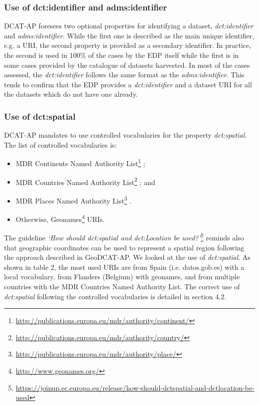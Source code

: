 \documentclass[<options>]{elsarticle}
\begin{document}
\subsubsection{Use of dct:identifier and adms:identifier}
DCAT-AP foresees two optional properties for identifying a dataset, \textit{dct:identifier} and \textit{adms:identifier}. While the first one is described as the main unique identifier, e.g. a URI, the second property is provided as a secondary identifier. In practice, the second is used in 100\% of the cases by the EDP itself while the first is in some cases provided by the catalogue of datasets harvested. In most of the cases assessed, the \textit{dct:identifier} follows the same format as the \textit{adms:identifier}. This tends to confirm that the EDP provides a \textit{dct:identifier} and a dataset URI for all the datasets which do not have one already.

\subsubsection{Use of dct:spatial}
DCAT-AP mandates to use controlled vocabularies for the property \textit{dct:spatial}. The list of controlled vocabularies is:

\begin{itemize}
\item MDR Continents Named Authority List\footnote{\href{  http://publications.europa.eu/mdr/authority/continent/}{  http://publications.europa.eu/mdr/authority/continent/}} ;
\item MDR Countries Named Authority List\footnote{\href{  http://publications.europa.eu/mdr/authority/country/}{  http://publications.europa.eu/mdr/authority/country/}} ; and
\item MDR Places Named Authority List\footnote{\href{  http://publications.europa.eu/mdr/authority/place/}{  http://publications.europa.eu/mdr/authority/place/}} .
\item Otherwise, Geonames\footnote{\href{  http://www.geonames.org/}{  http://www.geonames.org/}} URIs.
\end{itemize}

The guideline \textit{‘How should dct:spatial and dct:Location be used?’}\footnote{\href{  https://joinup.ec.europa.eu/release/how-should-dctspatial-and-dctlocation-be-used}{  https://joinup.ec.europa.eu/release/how-should-dctspatial-and-dctlocation-be-used}} reminds also that geographic coordinates can be used to represent a spatial region following the approach described in GeoDCAT-AP. We looked at the use of \textit{dct:spatial}. As shown in table 2, the most used URIs are from Spain (i.e. datos.gob.es) with a local vocabulary, from Flanders (Belgium) with geonames, and from multiple countries with the MDR Countries Named Authority List. The correct use of \textit{dct:spatial} following the controlled vocabularies is detailed in section 4.2. 
\end{document}
